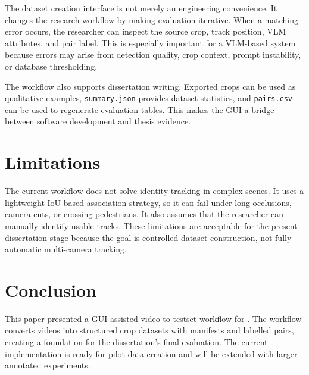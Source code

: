 The dataset creation interface is not merely an engineering convenience. It changes the research workflow by making evaluation iterative. When a matching error occurs, the researcher can inspect the source crop, track position, VLM attributes, and pair label. This is especially important for a VLM-based system because errors may arise from detection quality, crop context, prompt instability, or database thresholding.

The workflow also supports dissertation writing. Exported crops can be used as qualitative examples, \texttt{summary.json} provides dataset statistics, and \texttt{pairs.csv} can be used to regenerate evaluation tables. This makes the GUI a bridge between software development and thesis evidence.

\section{Limitations}

The current workflow does not solve identity tracking in complex scenes. It uses a lightweight IoU-based association strategy, so it can fail under long occlusions, camera cuts, or crossing pedestrians. It also assumes that the researcher can manually identify usable tracks. These limitations are acceptable for the present dissertation stage because the goal is controlled dataset construction, not fully automatic multi-camera tracking.

\section{Conclusion}

This paper presented a GUI-assisted video-to-testset workflow for \systemname. The workflow converts videos into structured crop datasets with manifests and labelled pairs, creating a foundation for the dissertation's final evaluation. The current implementation is ready for pilot data creation and will be extended with larger annotated experiments.
